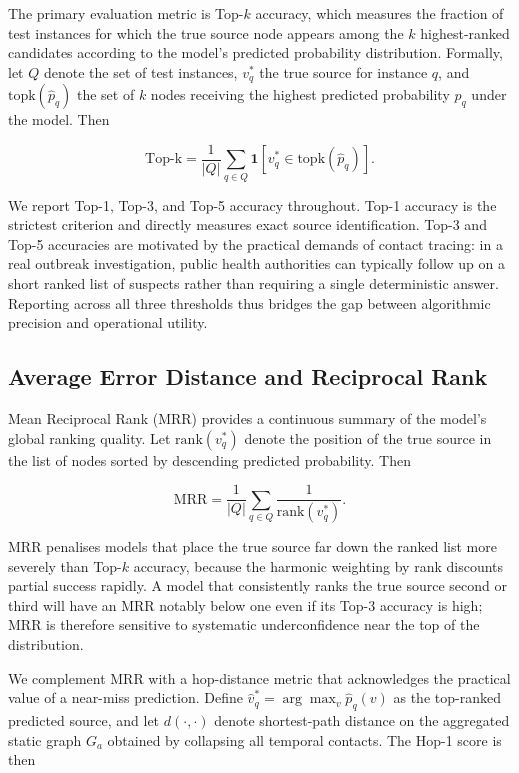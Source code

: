 The primary evaluation metric is Top-$k$ accuracy, which measures the fraction of test instances for which the true source node appears among the $k$ highest-ranked candidates according to the model's predicted probability distribution. Formally, let $Q$ denote the set of test instances, $v_q^*$ the true source for instance $q$, and $\mathrm{topk}(\hat{p}_q)$ the set of $k$ nodes receiving the highest predicted probability $\hat{p}_q$ under the model. Then

\[
    \mathrm{Top\text{-}k} = \frac{1}{|Q|} \sum_{q \in Q} \mathbf{1}\!\left[v_q^* \in \mathrm{topk}(\hat{p}_q)\right].
\]

We report Top-1, Top-3, and Top-5 accuracy throughout. Top-1 accuracy is the strictest criterion and directly measures exact source identification. Top-3 and Top-5 accuracies are motivated by the practical demands of contact tracing: in a real outbreak investigation, public health authorities can typically follow up on a short ranked list of suspects rather than requiring a single deterministic answer. Reporting across all three thresholds thus bridges the gap between algorithmic precision and operational utility.

\subsection{Average Error Distance and Reciprocal Rank}
\label{ssst:avgerr}

Mean Reciprocal Rank (MRR) provides a continuous summary of the model's global ranking quality. Let $\mathrm{rank}(v_q^*)$ denote the position of the true source in the list of nodes sorted by descending predicted probability. Then

\[
    \mathrm{MRR} = \frac{1}{|Q|} \sum_{q \in Q} \frac{1}{\mathrm{rank}(v_q^*)}.
\]

MRR penalises models that place the true source far down the ranked list more severely than Top-$k$ accuracy, because the harmonic weighting by rank discounts partial success rapidly. A model that consistently ranks the true source second or third will have an MRR notably below one even if its Top-3 accuracy is high; MRR is therefore sensitive to systematic underconfidence near the top of the distribution.

We complement MRR with a hop-distance metric that acknowledges the practical value of a near-miss prediction. Define $\hat{v}_q^* = \arg\max_v \hat{p}_q(v)$ as the top-ranked predicted source, and let $d(\cdot, \cdot)$ denote shortest-path distance on the aggregated static graph $G_a$ obtained by collapsing all temporal contacts. The Hop-1 score is then

